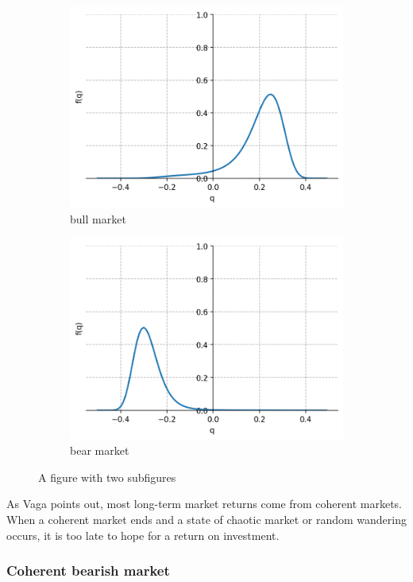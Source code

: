\begin{figure}[h!]
\centering
\begin{subfigure}{.5\textwidth}
  \centering
  \includegraphics[width=.8\linewidth]{figures/bull_market.png}
  \caption{bull market}
  \label{fig:bull_market}
\end{subfigure}%
\begin{subfigure}{.5\textwidth}
  \centering
  \includegraphics[width=.8\linewidth]{figures/bear_market.png}
  \caption{bear market}
  \label{fig:bear_market}
\end{subfigure}
\caption{A figure with two subfigures}
\label{fig:coherent_markets}
\end{figure}


As Vaga points out, most long-term market returns come from coherent markets. When a coherent market ends and a state of chaotic market or random wandering occurs, it is too late to hope for a return on investment.

\subsubsection*{Coherent bearish market}

